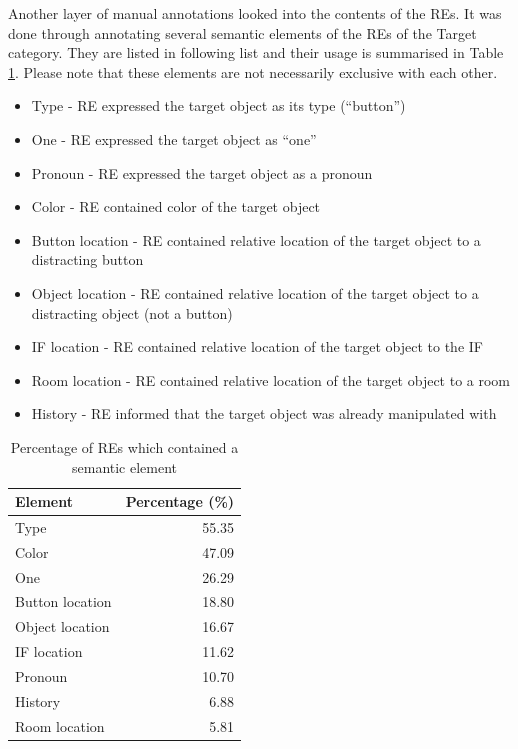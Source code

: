 Another layer of manual annotations looked into the contents of the REs. It was done through annotating several semantic elements of the REs of the Target category. They are listed in following list and their usage is summarised in Table \ref{tab:res-contents}. Please note that these elements are not necessarily exclusive with each other.

\begin{itemize}
\item
Type - RE expressed the target object as its type (``button'')
\item
One - RE expressed the target object as ``one''
\item
Pronoun - RE expressed the target object as a pronoun
\item
Color -  RE contained color of the target object
\item
Button location - RE contained relative location of the target object to a distracting button
\item
Object location - RE contained relative location of the target object to a distracting object (not a button)
\item 
IF location - RE contained relative location of the target object to the IF
\item
Room location - RE contained relative location of the target object to a room
\item
History - RE informed that the target object was already manipulated with
\end{itemize}

\begin{table}[!htbp]
 \centering
\begin{tabular}{lr}
\toprule
Element  & Percentage (\%)  \\
\midrule
Type   			& 55.35\\
Color			& 47.09\\
One 				& 26.29\\
Button location & 18.80\\
Object location 	& 16.67\\
IF location		& 11.62\\
Pronoun			& 10.70\\
History			& 6.88\\
Room location 	& 5.81\\
\bottomrule
\end{tabular}
\caption{Percentage of REs which contained a semantic element}
\label{tab:res-contents}
\end{table} 

